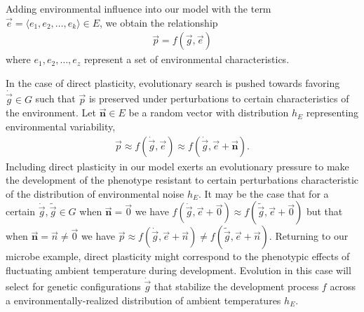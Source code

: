 Adding environmental influence into our model with the term $\vec{e} = \langle e_1, e_2, \ldots, e_k \rangle \in E$, we obtain the relationship
\begin{align*}
\vec{p} = f(\vec{g}, \vec{e})
\end{align*}
where $e_1, e_2, \ldots, e_z$ represent a set of environmental characteristics. 

In the case of direct plasticity, evolutionary search is pushed towards favoring $\dot{\vec{g}} \in G$ such that $\vec{p}$ is preserved under perturbations to certain characteristics of the environment. Let $\bm{\vec{n}} \in E$ be a random vector with distribution $h_E$ representing environmental variability,
\begin{align*}
\vec{p} \approx f(\dot{\vec{g}}, \vec{e})  \approx f(\dot{\vec{g}}, \vec{e} + \bm{\vec{n}}).
\end{align*}
Including direct plasticity in our model exerts an evolutionary pressure to make the development of the phenotype resistant to certain perturbations characteristic of the distribution of environmental noise $h_E$. It may be the case that for a certain 
$\dot{\vec{g}}, \tilde{\vec{g}} \in G$ when $\bm{\vec{n}} = \vec{0}$ we have $f(\dot{\vec{g}}, \vec{e} + \vec{0}) \approx f(\tilde{\vec{g}}, \vec{e} + \vec{0})$ but that when $\bm{\vec{n}} = \vec{n} \neq \vec{0}$ we have $\vec{p} \approx f(\dot{\vec{g}}, \vec{e} + \vec{n}) \neq f(\tilde{\vec{g}}, \vec{e} + \vec{n})$. Returning to our microbe example, direct plasticity might correspond to the phenotypic effects of fluctuating ambient temperature during development. Evolution in this case will select for genetic configurations $\dot{\vec{g}}$ that stabilize the development process $f$ across a environmentally-realized distribution of ambient temperatures $h_E$.

